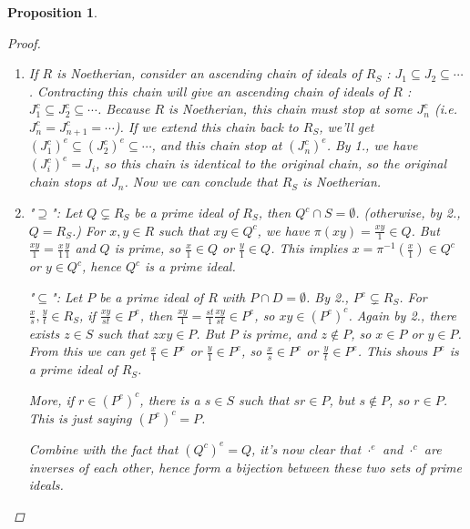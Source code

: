 \documentclass[a4paper]{article}
\theoremstyle{mystyle}
\newtheorem{prop}{Proposition}
\begin{document}
\begin{prop}
\begin{proof}
\begin{enumerate}
        Also, $I^e = R_S \iff \frac{1}{1} \in I^e \iff 1 \in (I^e)^c \iff s \cdot 1 = s \in I \textrm{ for some } s \in S
        \iff I \cap S \neq \emptyset$.

      \item
        If $R$ is Noetherian, consider an ascending chain of ideals of $R_S$ :
        $J_1 \subseteq J_2 \subseteq \cdots$.
        Contracting this chain will give an ascending chain of ideals of $R$ : 
        $J_1^c \subseteq J_2^c \subseteq \cdots$.
        Because $R$ is Noetherian, this chain must stop at some $J_n^c$ (i.e.
        $J_n^c = J_{n+1}^c = \cdots$). 
        If we extend this chain back to $R_S$, we'll get
        $(J_1^c)^e \subseteq (J_2^c)^e \subseteq \cdots$, and this chain
        stop at $(J_n^c)^e$.
        By 1., we have $(J_i^c)^e = J_i$, so this chain is identical to the original
        chain, so the original chain stops at $J_n$. Now
        we can conclude that $R_S$ is Noetherian.

      \item 
        "$\supseteq$":
        Let $Q \subsetneq R_S$ be a prime ideal of $R_S$, then $Q^c \cap S = \emptyset$.
        (otherwise, by 2., $Q = R_S$.)
        For $x, y \in R$ such that $xy \in Q^c$, we have $\pi(xy) = \frac{xy}{1} \in Q$.
        But $\frac{xy}{1} = \frac{x}{1}\frac{y}{1}$ and $Q$ is prime, so $\frac{x}{1} \in Q$ or $\frac{y}{1} \in Q$.
        This implies $x = \pi^{-1}(\frac{x}{1}) \in Q^c$ or $y \in Q^c$, hence
        $Q^c$ is a prime ideal.

        "$\subseteq$":
        Let $P$ be a prime ideal of $R$ with $P \cap D = \emptyset$.
        By 2., $P^e \subsetneq R_S$.
        For $\frac{x}{s}, \frac{y}{t} \in R_S$, if $\frac{xy}{st} \in P^e$, then
        $\frac{xy}{1} = \frac{st}{1}\frac{xy}{st} \in P^e$, so $xy \in (P^e)^c$.
        Again by 2., there exists $z \in S$ such that $zxy \in P$.
        But $P$ is prime, and $z \notin P$, so $x \in P$ or $y \in P$.
        From this we can get $\frac{x}{1} \in P^e$ or $\frac{y}{1} \in P^e$, so $\frac{x}{s} \in P^e$ or 
        $\frac{y}{t} \in P^e$.
        This shows $P^e$ is a prime ideal of $R_S$.

        More, if $r \in (P^e)^c$, there is a $s \in S$ such that $sr \in P$, 
        but $s \notin P$, so $r \in P$. This is just saying $(P^e)^c = P$.

        Combine with the fact that $(Q^c)^e = Q$, it's now clear that $\cdot^e$
        and $\cdot^c$ are inverses of each other, hence form a bijection between
        these two sets of prime ideals.
    \end{enumerate}
  \end{proof}
\end{prop}
\end{document}
